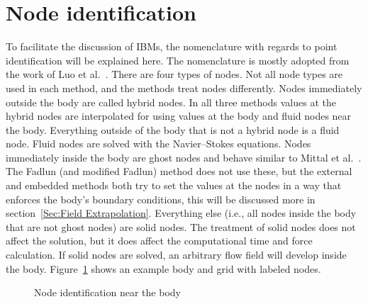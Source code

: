 \section{Node identification}
To facilitate the discussion of IBMs, the nomenclature with regards to point identification will be explained here. 
The nomenclature is mostly adopted from the work of Luo et al.~\cite{Luo:2012gx}. 
There are four types of nodes. 
Not all node types are used in each method, and the methods treat nodes differently. 
Nodes immediately outside the body are called hybrid nodes. 
In all three methods values at the hybrid nodes are interpolated for using values at the body and fluid nodes near the body. 
Everything outside of the body that is not a hybrid node is a fluid node. 
Fluid nodes are solved with the Navier--Stokes equations. 
Nodes immediately inside the body are ghost nodes and behave similar to Mittal et al.~\cite{Mittal:2005ii}. 
The Fadlun (and modified Fadlun) method does not use these, but the external and embedded methods both try to set the values at the nodes in a way that enforces the body's boundary conditions, this will be discussed more in section~\ref{Sec:Field Extrapolation}. 
Everything else (i.e., all nodes inside the body that are not ghost nodes) are solid nodes. 
The treatment of solid nodes does not affect the solution, but it does affect the computational time and force calculation.
If solid nodes are solved, an arbitrary flow field will develop inside the body. 
Figure~\ref{fig:node id} shows an example body and grid with labeled nodes. 

\begin{figure}[!htb]
	\centering
	
	\caption{Node identification near the body}
	\label{fig:node id}
\end{figure}

